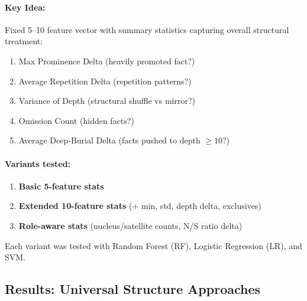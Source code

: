 \documentclass[12pt,a4paper]{article}
\begin{document}
\paragraph{Key Idea:} Fixed 5--10 feature vector with summary statistics capturing overall
structural treatment:
\begin{enumerate}
\item Max Prominence Delta (heavily promoted fact?)
\item Average Repetition Delta (repetition patterns?)
\item Variance of Depth (structural shuffle vs mirror?)
\item Omission Count (hidden facts?)
\item Average Deep-Burial Delta (facts pushed to depth $\geq 10$?)
\end{enumerate}

\paragraph{Variants tested:}
\begin{enumerate}
\item \textbf{Basic 5-feature stats}
\item \textbf{Extended 10-feature stats} (+ min, std, depth delta, exclusives)
\item \textbf{Role-aware stats} (nucleus/satellite counts, N/S ratio delta)
\end{enumerate}

Each variant was tested with Random Forest (RF), Logistic Regression (LR), and SVM.

\subsection{Results: Universal Structure Approaches}
\end{document}
